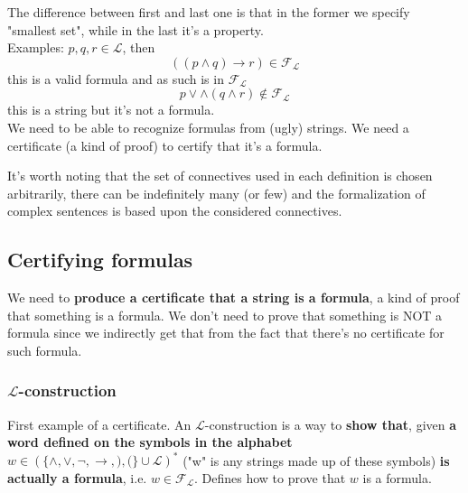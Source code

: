 \documentclass[11pt]{article}
\begin{document}
\begin{itemize}
		\newpage
		
		The difference between first and last one is that in the former we specify "smallest set", while in the last it's a property.\\
		
		Examples: $p,q,r \in \mathcal{L}$, then
		$$ ((p \wedge q) \rightarrow r) \in \mathcal{F}_\mathcal{L} $$
		this is a valid formula and as such is in $\mathcal{F}_\mathcal{L}$
		$$ p \vee \wedge (q \wedge r) \notin \mathcal{F}_\mathcal{L} $$
		this is a string but it's not a formula.\\
		We need to be able to recognize formulas from (ugly) strings. We need a certificate (a kind of proof) to certify that it's a formula.\\
	\end{itemize} 
	
	It's worth noting that the set of connectives used in each definition is chosen arbitrarily, there can be indefinitely many (or few) and the formalization of complex sentences is based upon the considered connectives.\\
	
	
	\newpage
	
	\subsection{Certifying formulas}
	We need to \textbf{produce a certificate that a string is a formula}, a kind of proof that something is a formula. We don't need to prove that something is NOT a formula since we indirectly get that from the fact that there's no certificate for such formula.\\
	
	\subsubsection{$\mathcal{L}$-construction} 
	First example of a certificate. An $\mathcal{L}$-construction is a way to \textbf{show that}, given \textbf{a word defined on the symbols in the alphabet} $w \in \left(\{\wedge, \vee, \neg, \rightarrow, ), (\} \cup \mathcal{L}\right)^\ast$ ("w" is any strings made up of these symbols) \textbf{is actually a formula}, i.e. $w \in \mathcal{F}_{\mathcal{L}}$. Defines how to prove that $w$ is a formula.\\
	
\end{document}
